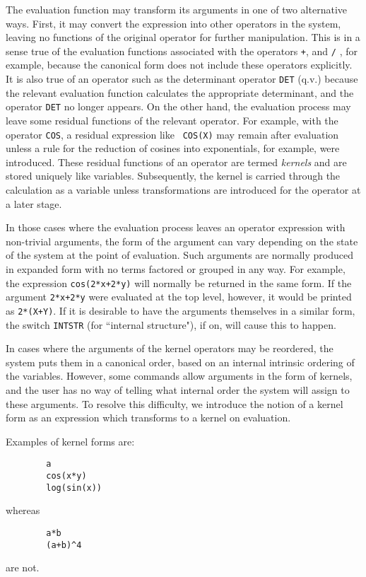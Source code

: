 The evaluation function may transform its arguments in one of two
alternative ways.  First, it may convert the expression into other
operators in the system, leaving no functions of the original operator for
further manipulation.  This is in a sense true of the evaluation functions
associated with the operators {\tt +}, {\tt *} and {\tt /} , for example,
because the canonical form does not include these
operators explicitly.  It is also true of an operator such as the
determinant operator {\tt DET}  (q.v.) because the relevant
evaluation function calculates the appropriate determinant, and the
operator {\tt DET} no longer appears.  On the other hand, the evaluation
process may leave some residual functions of the relevant operator.  For
example, with the operator {\tt COS}, a residual expression like {\tt
COS(X)} may remain after evaluation unless a rule for the reduction of
cosines into exponentials, for example, were introduced.  These residual
functions of an operator are termed {\em kernels} and are
stored uniquely like variables.  Subsequently, the kernel is carried
through the calculation as a variable unless transformations are
introduced for the operator at a later stage.

In those cases where the evaluation process leaves an operator expression
with non-trivial arguments, the form of the argument can vary depending on
the state of the system at the point of evaluation.  Such arguments are
normally produced in expanded form with no terms factored or grouped in
any way.  For example, the expression {\tt cos(2*x+2*y)} will normally be
returned in the same form.  If the argument {\tt 2*x+2*y} were evaluated
at the top level, however, it would be printed as {\tt 2*(X+Y)}.  If it is
desirable to have the arguments themselves in a similar form, the switch
{\tt INTSTR}  (for ``internal structure"), if on, will
cause this to happen.

In cases where the arguments of the kernel operators may be reordered, the
system puts them in a canonical order, based on an internal intrinsic
ordering of the variables. However, some commands allow arguments in the
form of kernels, and the user has no way of telling what internal order the
system will assign to these arguments. To resolve this difficulty, we
introduce the notion of a kernel form as an expression which transforms to
a kernel on evaluation.

Examples of kernel forms are:
\begin{verbatim}
        a
        cos(x*y)
        log(sin(x))
\end{verbatim}
whereas
\begin{verbatim}
        a*b
        (a+b)^4
\end{verbatim}
are not.

